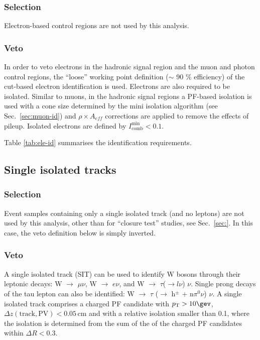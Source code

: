 \subsubsection{Selection}

Electron-based control regions are not used by this analysis. 

\subsubsection{Veto}

In order to veto electrons in the hadronic signal region and the muon
and photon control regions, the ``loose'' working point definition
($\sim$ 90 $\%$ efficiency) of the cut-based electron identification
\cite{electron-id} is used.  Electrons are also required to be
isolated.  Similar to muons, in the hadronic signal regions a PF-based
isolation \cite{pf-photon} is used with a cone size determined by the
mini isolation algorithm (see Sec.~\ref{sec:muon-id}) and $\rho\times
A_{eff}$ corrections are applied to remove the effects of pileup.
Isolated electrons are defined by $I^\mathrm{min}_\mathrm{comb} < 0.1$.

Table \ref{tab:ele-id} summarises the identification requirements. 

\subsection{Single isolated tracks}
\label{sec:SIT}

\subsubsection{Selection}

Event samples containing only a single isolated track (and no leptons)
are not used by this analysis, other than for ``closure test''
studies, see Sec.~\ref{sec:}. In this case, the veto definition below
is simply inverted.

\subsubsection{Veto}

A single isolated track (SIT) can be used to identify W bosons through
their leptonic decays: W $\rightarrow$ $\mu \nu$, W $\rightarrow$
$e\nu$, and W $\rightarrow$ $\tau$($\rightarrow l\nu$) $\nu$.  Single
prong decays of the tau lepton can also be identified: W $\rightarrow$
$\tau$ ($\rightarrow$ h$^{\pm}$ + n$\pi^{0}\nu$) $\nu$.  A single
isolated track comprises a charged PF candidate with $\Pt > 10 \gev$,
$\Delta z(\mathrm{track}, \mathrm{PV}) < 0.05 \, \mathrm{cm}$ and with
a relative isolation smaller than 0.1, where the isolation is
determined from the sum of the \Pt of the charged PF candidates within
$\Delta R < 0.3$.

